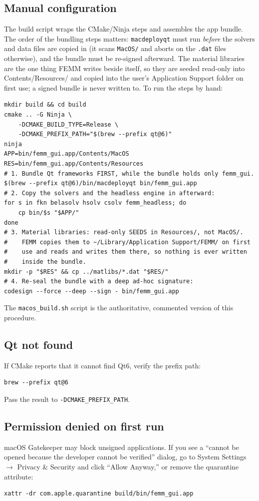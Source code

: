 \documentclass[11pt]{article}
\begin{document}
\subsection{Manual configuration}

The build script wraps the CMake/Ninja steps and assembles the app
bundle.  The order of the bundling steps matters: \texttt{macdeployqt}
must run \emph{before} the solvers and data files are copied in (it scans
\texttt{MacOS/} and aborts on the \texttt{.dat} files otherwise), and the
bundle must be re-signed afterward.  The material libraries are the one
thing FEMM writes beside itself, so they are seeded read-only into
Contents/Resources/ and copied into the user's Application Support
folder on first use; a signed bundle is never written to.
To run the steps by hand:
\begin{lstlisting}
mkdir build && cd build
cmake .. -G Ninja \
    -DCMAKE_BUILD_TYPE=Release \
    -DCMAKE_PREFIX_PATH="$(brew --prefix qt@6)"
ninja
APP=bin/femm_gui.app/Contents/MacOS
RES=bin/femm_gui.app/Contents/Resources
# 1. Bundle Qt frameworks FIRST, while the bundle holds only femm_gui.
$(brew --prefix qt@6)/bin/macdeployqt bin/femm_gui.app
# 2. Copy the solvers and the headless engine in afterward:
for s in fkn belasolv hsolv csolv femm_headless; do
    cp bin/$s "$APP/"
done
# 3. Material libraries: read-only SEEDS in Resources/, not MacOS/.
#    FEMM copies them to ~/Library/Application Support/FEMM/ on first
#    use and reads and writes them there, so nothing is ever written
#    inside the bundle.
mkdir -p "$RES" && cp ../matlibs/*.dat "$RES/"
# 4. Re-seal the bundle with a deep ad-hoc signature:
codesign --force --deep --sign - bin/femm_gui.app
\end{lstlisting}
The \texttt{macos\_build.sh} script is the authoritative, commented version
of this procedure.

\subsection{Qt not found}

If CMake reports that it cannot find Qt6, verify the prefix path:
\begin{lstlisting}
brew --prefix qt@6
\end{lstlisting}
Pass the result to \texttt{-DCMAKE\_PREFIX\_PATH}.

\subsection{Permission denied on first run}

macOS Gatekeeper may block unsigned applications.  If you see a
``cannot be opened because the developer cannot be verified'' dialog,
go to System Settings $\rightarrow$ Privacy \& Security and click
``Allow Anyway,'' or remove the quarantine attribute:
\begin{lstlisting}
xattr -dr com.apple.quarantine build/bin/femm_gui.app
\end{lstlisting}
\end{document}
